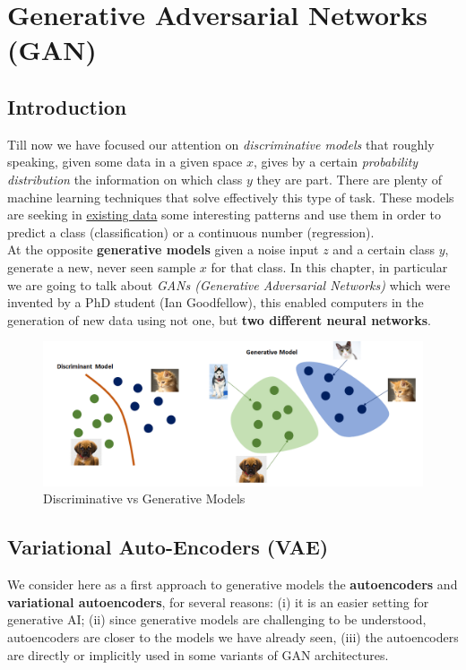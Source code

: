 \chapter{Generative Adversarial Networks (GAN)}

\section{Introduction}
Till now we have focused our attention on \textit{discriminative models} that roughly speaking, given some data in a given space $x$, gives by a certain \textit{probability distribution} the information on which class $y$ they are part. There are plenty of machine learning techniques that solve effectively this type of task. These models are seeking in \underline{existing data} some interesting patterns and use them in order to predict a class (classification) or a continuous number (regression).\\
At the opposite \textbf{generative models} given a noise input $z$ and a certain class $y$, generate a new, never seen sample $x$ for that class. In this chapter, in particular we are going to talk about \textit{GANs (Generative Adversarial Networks)} which were invented by a PhD student (Ian Goodfellow), this enabled computers in the generation of new data using not one, but \textbf{two different neural networks}. 

\begin{figure}
    \centering
    \includegraphics[scale=0.3]{img/generative_1.png}
    \caption{Discriminative vs Generative Models}
\end{figure}

\section{Variational Auto-Encoders (VAE)}
We consider here as a first approach to generative models the \textbf{autoencoders} and \textbf{variational autoencoders}, for several reasons: (i) it is an easier setting for generative AI; (ii) since generative models are challenging to be understood, autoencoders are closer to the models we have already seen, (iii) the autoencoders are directly or implicitly used in some variants of GAN architectures.

